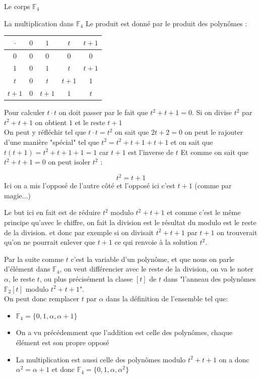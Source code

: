 \begin{parag}{Le corps $\mathbb{F}_4$}
\begin{subparag}{La multiplication dans $\mathbb{F}_4$}
        Le produit est donné par le produit des polynômes :\\
                \begin{tabular}{|c||c|c|c|c|}
        \hline
            $\cdot$ & $0$ & $1$ & $t$ & $t+1$  \\
            \hline
            \hline
            $0$ & $0$ & $0$ & $0$ & $0$ \\
            \hline
            $1$ & $0$ & $1$ & $t$ & $t+1$ \\
            \hline
            $t$ & $0$ & $t$ & $t+1$ & $1$ \\
            \hline
            $t+1$ & $0$ & $t+1$ & $1$ & $t$ \\
            \hline
        \end{tabular}
        Pour calculer $t\cdot t$ on doit passer par le fait que $t^2 + t + 1 = 0$. Si on divise $t^2$ par $t^2 + t +1$ on obtient $1$ et le reste $t+1$
        \\
        On peut y réfléchir tel que $t\cdot t = t^2$ on sait que $2t + 2 = 0$ on peut le rajouter d'une manière "spécial" tel que $t^2 = t^2 + t + 1 + t + 1$ et on sait que $t(t+1) = t^2 + t + 1 + 1 = 1$ car $t+1$ est l'inverse de $t$ Et comme on sait que $t^2 + t + 1 = 0$ on peut isoler $t^2$ : 
        
        \[t^2 = t + 1\]
        Ici on a mis l'opposé de l'autre côté et l'opposé ici c'est $t+1$ (comme par magie...)
        \begin{framedremark}
            Le but ici en fait est de réduire $t^2$ modulo $t^2 + t + 1$ et comme c'est le même principe qu'avec le chiffre, on fait la division est le résultat du modulo est le reste de la division. et donc par exemple si on divisait $t^2 + t + 1$ par $t+1$ on trouverait qu'on ne pourrait enlever que $t+1$ ce qui renvoie à la solution $t^2$.
        \end{framedremark}
        Par la suite comme $t$ c'est la variable d'un polynôme, et que nous on parle d'élément dans $\mathbb{F}_4$, on veut différencier avec le reste de la division, on va le noter $\alpha$, le reste $t$, ou plus précisément la classe $[t]$ de $t$ dans "l'anneau des polynômes $\mathbb{F}_2[t]$ modulo $t^2 + t + 1$".
        \\
        On peut donc remplacer $t$ par $\alpha$ dans la définition de l'ensemble tel que:
        \begin{itemize}
            \item $\mathbb{F}_4 = \{0, 1, \alpha, \alpha + 1\}$
            \item On a vu précédemment que l'addition est celle des polynômes, chaque élément est son propre opposé
            \item La multiplication est aussi celle des polynômes modulo $t^2 + t + 1$ on a donc $\alpha^2 = \alpha  + 1$ et donc $\mathbb{F}_4 = \{0, 1, \alpha, \alpha^2\}$

        \end{itemize}
    \end{subparag}
\end{parag}
